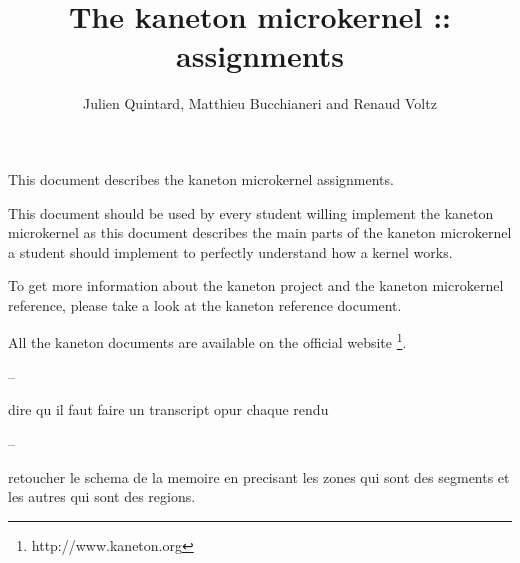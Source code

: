 
%
%

\def\path{../../..}

%
%



%
%

\rhead{}

%
%

\title{The kaneton microkernel :: assignments
       \logos}

%
%

\author{\small{Julien Quintard},
        \small{Matthieu Bucchianeri} and
        \small{Renaud Voltz}}

%
%



%
%

\maketitle

%
%

This document describes the kaneton microkernel assignments.

This document should be used by every student willing implement
the kaneton microkernel as this document describes the main parts
of the kaneton microkernel a student should implement to perfectly
understand how a kernel works.

To get more information about the kaneton project and the kaneton
microkernel reference, please take a look at the kaneton reference
document.

All the kaneton documents are available on the official website
  \footnote{http://www.kaneton.org}.

%
%

\tableofcontents

%
%





%



--

dire qu il faut faire un transcript opur chaque rendu

--

retoucher le schema de la memoire en precisant les zones qui sont des
segments et les autres qui sont des regions.
